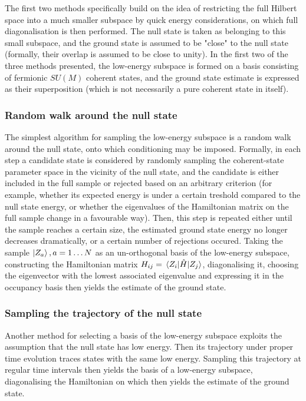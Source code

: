 The first two methods specifically build on the idea of restricting the full Hilbert space into a much smaller subspace by quick energy considerations, on which full diagonalisation is then performed. The null state is taken as belonging to this small subspace, and the ground state is assumed to be "close" to the null state (formally, their overlap is assumed to be close to unity). In the first two of the three methods presented, the low-energy subspace is formed on a basis consisting of fermionic $SU(M)$ coherent states, and the ground state estimate is expressed as their superposition (which is not necessarily a pure coherent state in itself).

\subsubsection{Random walk around the null state}
The simplest algorithm for sampling the low-energy subspace is a random walk around the null state, onto which conditioning may be imposed. Formally, in each step a candidate state is considered by randomly sampling the coherent-state parameter space in the vicinity of the null state, and the candidate is either included in the full sample or rejected based on an arbitrary criterion (for example, whether its expected energy is under a certain treshold compared to the null state energy, or whether the eigenvalues of the Hamiltonian matrix on the full sample change in a favourable way). Then, this step is repeated either until the sample reaches a certain size, the estimated ground state energy no longer decreases dramatically, or a certain number of rejections occured. Taking the sample $\ket{Z_a}, a=1\dots N$ as an un-orthogonal basis of the low-energy subspace, constructing the Hamiltonian matrix $H_{ij}=\mel{Z_i}{\hat{H}}{Z_j}$, diagonalising it, choosing the eigenvector with the lowest associated eigenvalue and expressing it in the occupancy basis then yields the estimate of the ground state.

\subsubsection{Sampling the trajectory of the null state}
Another method for selecting a basis of the low-energy subspace exploits the assumption that the null state has low energy. Then its trajectory under proper time evolution traces states with the same low energy. Sampling this trajectory at regular time intervals then yields the basis of a low-energy subspace, diagonalising the Hamiltonian on which then yields the estimate of the ground state.

